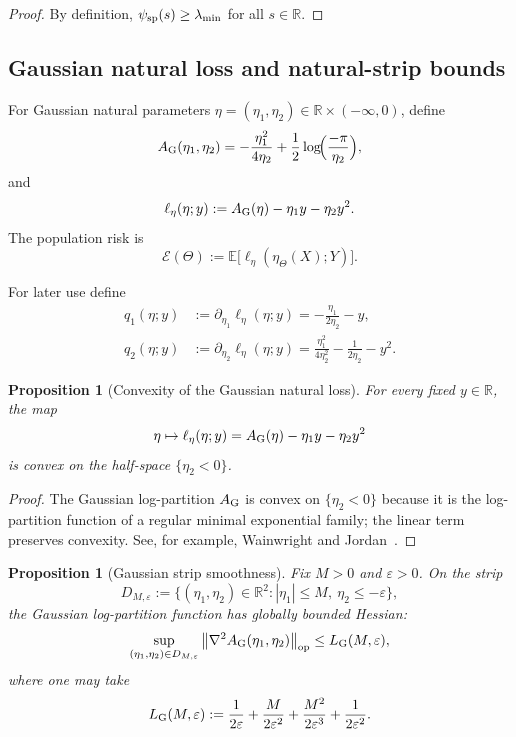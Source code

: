\documentclass[11pt]{article}
\newtheorem{proposition}[theorem]{Proposition}
\theoremstyle{definition}
\newcommand{\R}{\mathbb{R}}
\newcommand{\E}{\mathbb{E}}
\newcommand{\norm}[1]{\left\lVert #1 \right\rVert}
\newcommand{\cE}{\mathcal{E}}
\begin{document}
\begin{proof}
By definition, $\psi_{\rm sp}(s)\ge \lambda_{\min}$ for all $s\in\R$.
\end{proof}

\subsection{Gaussian natural loss and natural-strip bounds}

For Gaussian natural parameters
$\eta=(\eta_1,\eta_2)\in \R\times(-\infty,0)$, define
\[
  A_{\rm G}(\eta_1,\eta_2)
  =
  -\frac{\eta_1^2}{4\eta_2}
  +
  \frac12\log\!\Bigl(\frac{-\pi}{\eta_2}\Bigr),
\]
and
\begin{equation}
  \ell_\eta(\eta;y)
  :=
  A_{\rm G}(\eta)-\eta_1 y-\eta_2 y^2.
  \label{eq:gaussian_nll_eta}
\end{equation}
The population risk is
\begin{equation}
  \cE(\Theta)
  :=
  \E\big[\ell_\eta(\eta_\Theta(X);Y)\big].
  \label{eq:population_risk}
\end{equation}

For later use define
\begin{align}
  q_1(\eta;y)
  &:=
  \partial_{\eta_1}\ell_\eta(\eta;y)
  =
  -\frac{\eta_1}{2\eta_2}-y,
  \label{eq:q1-k1}
  \\
  q_2(\eta;y)
  &:=
  \partial_{\eta_2}\ell_\eta(\eta;y)
  =
  \frac{\eta_1^2}{4\eta_2^2}
  -
  \frac{1}{2\eta_2}
  -
  y^2.
  \label{eq:q2-k1}
\end{align}

\begin{proposition}[Convexity of the Gaussian natural loss]
\label{prop:gaussian-natural-convexity}
For every fixed $y\in\R$, the map
\[
  \eta\mapsto \ell_\eta(\eta;y)=A_{\rm G}(\eta)-\eta_1 y-\eta_2 y^2
\]
is convex on the half-space $\{\eta_2<0\}$.
\end{proposition}

\begin{proof}
The Gaussian log-partition $A_{\rm G}$ is convex on $\{\eta_2<0\}$ because it
is the log-partition function of a regular minimal exponential family; the
linear term preserves convexity. See, for example,
Wainwright and Jordan~\cite{WainwrightJordan2008}.
\end{proof}

\begin{proposition}[Gaussian strip smoothness]
\label{prop:gaussian-smoothness-k1}
Fix $M>0$ and $\varepsilon>0$. On the strip
\[
  D_{M,\varepsilon}
  :=
  \{(\eta_1,\eta_2)\in\R^2: |\eta_1|\le M,\ \eta_2\le -\varepsilon\},
\]
the Gaussian log-partition function has globally bounded Hessian:
\[
  \sup_{(\eta_1,\eta_2)\in D_{M,\varepsilon}}
  \norm{\nabla^2 A_{\rm G}(\eta_1,\eta_2)}_{\mathrm{op}}
  \le
  L_{\rm G}(M,\varepsilon),
\]
where one may take
\[
  L_{\rm G}(M,\varepsilon)
  :=
  \frac{1}{2\varepsilon}
  +
  \frac{M}{2\varepsilon^2}
  +
  \frac{M^2}{2\varepsilon^3}
  +
  \frac{1}{2\varepsilon^2}.
\]
\end{proposition}
\end{document}
